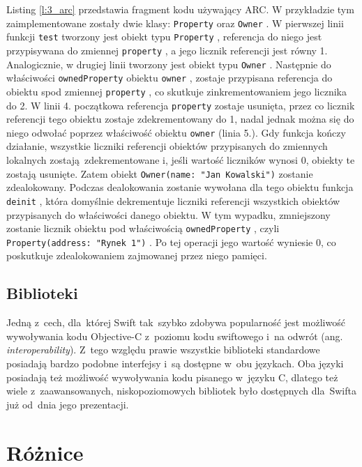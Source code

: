 \documentclass[mgr, shortabstract]{iithesis}
\newcommand{\ang}[1]{ang. \textit{#1}}
\newcommand{\swiftinline}[1]{
    \texttt{#1}
}
\begin{document}
Listing \ref{l:3_arc} przedstawia fragment kodu używający ARC. W przykładzie tym zaimplementowane zostały dwie klasy: \swiftinline{Property} oraz \swiftinline{Owner}. W pierwszej linii funkcji \swiftinline{test} tworzony jest obiekt typu \swiftinline{Property}, referencja do niego jest przypisywana do zmiennej \swiftinline{property}, a jego licznik referencji jest równy 1. Analogicznie, w drugiej linii tworzony jest obiekt typu \swiftinline{Owner}. Następnie do właściwości \swiftinline{ownedProperty} obiektu \swiftinline{owner}, zostaje przypisana referencja do obiektu spod zmiennej \swiftinline{property}, co skutkuje zinkrementowaniem jego licznika do 2. W linii 4. początkowa referencja \swiftinline{property} zostaje usunięta, przez co licznik referencji tego obiektu zostaje zdekrementowany do 1, nadal jednak można się do niego odwołać poprzez właściwość obiektu \swiftinline{owner} (linia 5.). Gdy funkcja kończy działanie, wszystkie liczniki referencji obiektów przypisanych do zmiennych lokalnych zostają zdekrementowane i, jeśli wartość liczników wynosi 0, obiekty te zostają usunięte. Zatem obiekt \swiftinline{Owner(name: "Jan Kowalski")} zostanie zdealokowany. Podczas dealokowania zostanie wywołana dla tego obiektu funkcja \swiftinline{deinit}, która domyślnie dekrementuje liczniki referencji wszystkich obiektów przypisanych do właściwości danego obiektu. W tym wypadku, zmniejszony zostanie licznik obiektu pod właściwością \swiftinline{ownedProperty}, czyli \swiftinline{Property(address: "Rynek 1")}. Po tej operacji jego wartość wyniesie 0, co poskutkuje zdealokowaniem zajmowanej przez niego pamięci.

\subsection{Biblioteki}

Jedną z~cech, dla~której Swift tak~szybko zdobywa popularność jest możliwość wywoływania kodu Objective-C z~poziomu kodu swiftowego i~na odwrót (\ang{interoperability}). Z~tego względu prawie wszystkie biblioteki standardowe posiadają bardzo podobne interfejsy i~są dostępne w~obu językach. Oba języki posiadają też możliwość wywoływania kodu pisanego w~języku C, dlatego też wiele z~zaawansowanych, niskopoziomowych bibliotek było dostępnych dla~Swifta już od~dnia jego prezentacji.

\section{Różnice}
\end{document}
